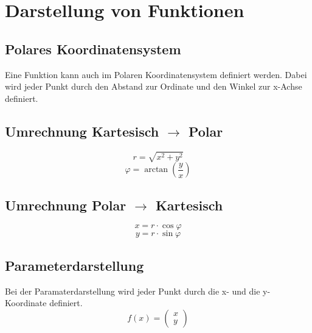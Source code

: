 \section{Darstellung von Funktionen}
\subsection{Polares Koordinatensystem}
Eine Funktion kann auch im Polaren Koordinatensystem definiert werden. Dabei wird jeder Punkt durch den Abstand zur Ordinate und den Winkel zur x-Achse definiert. 

\subsection{Umrechnung Kartesisch $\rightarrow$ Polar}
\[ \boxed{r = \sqrt{x^2 + y^2}} \]
\[ \boxed{\varphi = \arctan\left(\frac{y}{x}\right)} \]

\subsection{Umrechnung Polar $\rightarrow$ Kartesisch}
\[ \boxed{x = r \cdot \cos{\varphi}} \]
\[ \boxed{y = r \cdot \sin{\varphi}} \]

\subsection{Parameterdarstellung}
Bei der Paramaterdarstellung wird jeder Punkt durch die x- und die y-Koordinate definiert. 
\[ \boxed{f(x) = \left(\begin{matrix} x\\ y \end{matrix}\right)} \]
